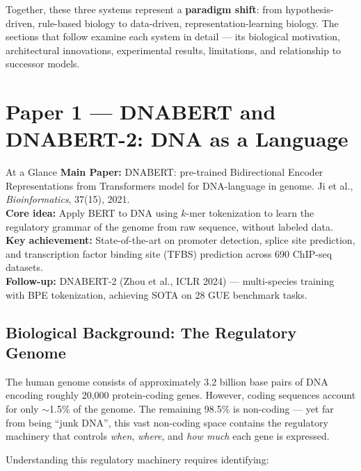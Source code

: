 ﻿\documentclass[12pt,a4paper]{article}
\begin{document}
Together, these three systems represent a \textbf{paradigm shift}: from hypothesis-driven, rule-based biology to data-driven, representation-learning biology. The sections that follow examine each system in detail --- its biological motivation, architectural innovations, experimental results, limitations, and relationship to successor models.


\newpage
\section{Paper 1 --- DNABERT and DNABERT-2: DNA as a Language}

\begin{keybox}{At a Glance}
\textbf{Main Paper:} DNABERT: pre-trained Bidirectional Encoder Representations from Transformers model for DNA-language in genome. Ji et al., \textit{Bioinformatics}, 37(15), 2021.\\
\textbf{Core idea:} Apply BERT to DNA using $k$-mer tokenization to learn the regulatory grammar of the genome from raw sequence, without labeled data.\\
\textbf{Key achievement:} State-of-the-art on promoter detection, splice site prediction, and transcription factor binding site (TFBS) prediction across 690 ChIP-seq datasets.\\
\textbf{Follow-up:} DNABERT-2 (Zhou et al., ICLR 2024) --- multi-species training with BPE tokenization, achieving SOTA on 28 GUE benchmark tasks.
\end{keybox}

\subsection{Biological Background: The Regulatory Genome}

The human genome consists of approximately 3.2 billion base pairs of DNA encoding roughly 20,000 protein-coding genes. However, coding sequences account for only $\sim$1.5\% of the genome. The remaining 98.5\% is non-coding --- yet far from being ``junk DNA'', this vast non-coding space contains the regulatory machinery that controls \emph{when}, \emph{where}, and \emph{how much} each gene is expressed.

Understanding this regulatory machinery requires identifying:
\end{document}

